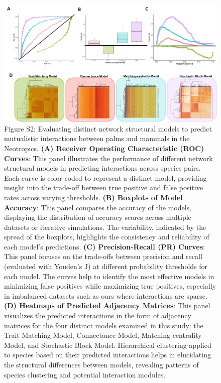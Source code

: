 \documentclass[
]{agujournal2019}
\begin{document}
\begin{figure}[H]

{\centering \includegraphics{Sup_figures/00_figure_data_metaweb_fit.png}

}

\caption{Figure S2: Evaluating distinct network structural models to
predict mutualistic interactions between palms and mammals in the
Neotropics. \textbf{(A) Receiver Operating Characteristic (ROC) Curves}:
This panel illustrates the performance of different network structural
models in predicting interactions across species pairs. Each curve is
color-coded to represent a distinct model, providing insight into the
trade-off between true positive and false positive rates across varying
thresholds. \textbf{(B) Boxplots of Model Accuracy}: This panel compares
the accuracy of the models, displaying the distribution of accuracy
scores across multiple datasets or iterative simulations. The
variability, indicated by the spread of the boxplots, highlights the
consistency and reliability of each model's predictions. \textbf{(C)
Precision-Recall (PR) Curves}: This panel focuses on the trade-offs
between precision and recall (evaluated with Youden's J) at different
probability thresholds for each model. The curves help to identify the
most effective models in minimizing false positives while maximizing
true positives, especially in imbalanced datasets such as ours where
interactions are sparse. \textbf{(D) Heatmaps of Predicted Adjacency
Matrices}: This panel visualizes the predicted interactions in the form
of adjacency matrices for the four distinct models examined in this
study: the Trait Matching Model, Connectance Model, Matching-centrality
Model, and Stochastic Block Model. Hierarchical clustering applied to
species based on their predicted interactions helps in elucidating the
structural differences between models, revealing patterns of species
clustering and potential interaction modules.}

\end{figure}%
\end{document}
